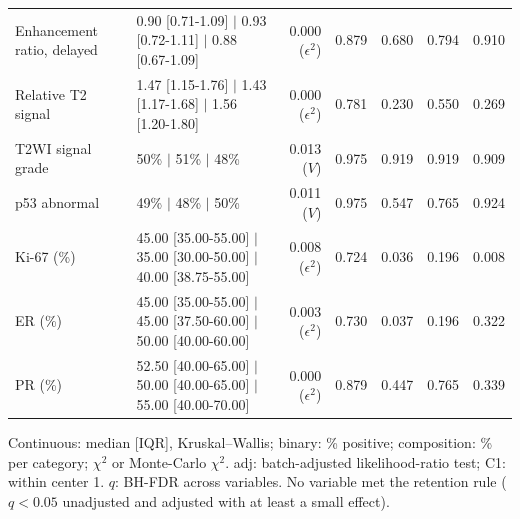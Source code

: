\begin{table}[htbp]
{\begin{tabular}{llrrrrr}
Enhancement ratio, delayed & 0.90 [0.71-1.09] $|$ 0.93 [0.72-1.11] $|$ 0.88 [0.67-1.09] & 0.000 ($\epsilon^2$) & 0.879 & 0.680 & 0.794 & 0.910 \\
Relative T2 signal & 1.47 [1.15-1.76] $|$ 1.43 [1.17-1.68] $|$ 1.56 [1.20-1.80] & 0.000 ($\epsilon^2$) & 0.781 & 0.230 & 0.550 & 0.269 \\
T2WI signal grade & 50\% $|$ 51\% $|$ 48\% & 0.013 ($V$) & 0.975 & 0.919 & 0.919 & 0.909 \\
p53 abnormal & 49\% $|$ 48\% $|$ 50\% & 0.011 ($V$) & 0.975 & 0.547 & 0.765 & 0.924 \\
Ki-67 (\%) & 45.00 [35.00-55.00] $|$ 35.00 [30.00-50.00] $|$ 40.00 [38.75-55.00] & 0.008 ($\epsilon^2$) & 0.724 & 0.036 & 0.196 & 0.008 \\
ER (\%) & 45.00 [35.00-55.00] $|$ 45.00 [37.50-60.00] $|$ 50.00 [40.00-60.00] & 0.003 ($\epsilon^2$) & 0.730 & 0.037 & 0.196 & 0.322 \\
PR (\%) & 52.50 [40.00-65.00] $|$ 50.00 [40.00-65.00] $|$ 55.00 [40.00-70.00] & 0.000 ($\epsilon^2$) & 0.879 & 0.447 & 0.765 & 0.339 \\
\bottomrule
\end{tabular}}
\par\smallskip\parbox{0.95\linewidth}{\footnotesize Continuous: median [IQR], Kruskal--Wallis; binary: \% positive; composition: \% per category; $\chi^2$ or Monte-Carlo $\chi^2$. adj: batch-adjusted likelihood-ratio test; C1: within center 1. $q$: BH-FDR across variables. No variable met the retention rule ($q<0.05$ unadjusted and adjusted with at least a small effect).}
\end{table}
